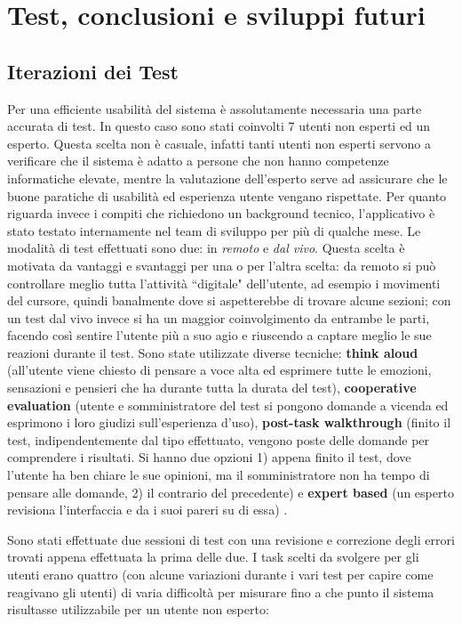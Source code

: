 \documentclass[a4paper,10pt]{memoir}
\begin{document}
\chapter{Test, conclusioni e sviluppi futuri}

\section{Iterazioni dei Test}

Per una efficiente usabilità del sistema è assolutamente necessaria una parte accurata di test.
In questo caso sono stati coinvolti 7 utenti non esperti ed un esperto.
Questa scelta non è casuale, infatti tanti utenti non esperti servono a verificare che il sistema è adatto a persone che non hanno competenze informatiche elevate, mentre la valutazione dell'esperto serve ad assicurare che le buone paratiche di usabilità ed esperienza utente vengano rispettate.
Per quanto riguarda invece i compiti che richiedono un background tecnico, l'applicativo è stato testato internamente nel team di sviluppo per più di qualche mese.
Le modalità di test effettuati sono due: in \textit{remoto} e \textit{dal vivo}. Questa scelta è motivata da vantaggi e svantaggi per una o per l'altra scelta: da remoto si può controllare meglio tutta l'attività ``digitale" dell'utente, ad esempio i movimenti del cursore, quindi banalmente dove si aspetterebbe di trovare alcune sezioni; con un test dal vivo invece si ha un maggior coinvolgimento da entrambe le parti, facendo così sentire l'utente più a suo agio e riuscendo a captare meglio le sue reazioni durante il test.
Sono state utilizzate diverse tecniche: \textbf{think aloud} (all'utente viene chiesto di pensare a voce alta ed esprimere tutte le emozioni, sensazioni e pensieri che ha durante tutta la durata del test), \textbf{cooperative evaluation} (utente e somministratore del test si pongono domande a vicenda ed esprimono i loro giudizi sull'esperienza d'uso), \textbf{post-task walkthrough} (finito il test, indipendentemente dal tipo effettuato, vengono poste delle domande per comprendere i risultati. Si hanno due opzioni 1) appena finito il test, dove l'utente ha ben chiare le sue opinioni, ma il somministratore non ha tempo di pensare alle domande, 2) il contrario del precedente) e \textbf{expert based} (un esperto revisiona l'interfaccia e da i suoi pareri su di essa) \cite{hcibook}.

Sono stati effettuate due sessioni di test con una revisione e correzione degli errori trovati appena effettuata la prima delle due.
I task scelti da svolgere per gli utenti erano quattro (con alcune variazioni durante i vari test per capire come reagivano gli utenti) di varia difficoltà per misurare fino a che punto il sistema risultasse utilizzabile per un utente non esperto:
\end{document}
